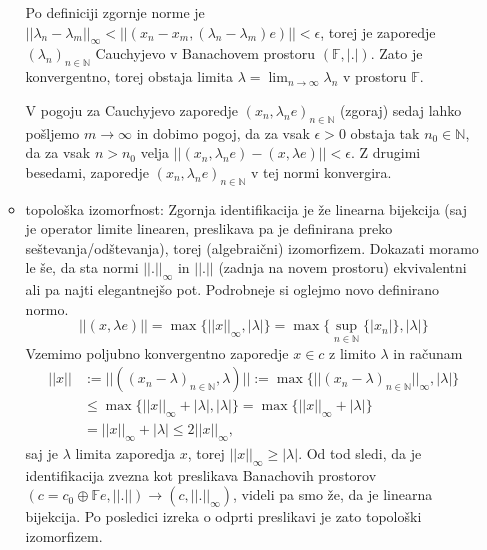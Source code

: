 \documentclass[a4paper, 12pt]{article}
\newcommand{\N}{\mathbb{N}}
\newcommand{\F}{\mathbb{F}}
\begin{document}
\begin{enumerate}[label=(\alph*)]
\begin{itemize}
		Po definiciji zgornje norme je $||\lambda_n - \lambda_m||_\infty < ||(x_n - x_m, (\lambda_n-\lambda_m)e)|| < \epsilon$,
		torej je zaporedje $(\lambda_n)_{n\in\N}$ Cauchyjevo v Banachovem prostoru $(\F, |.|)$. Zato je konvergentno, torej obstaja limita $\lambda = \lim_{n \to \infty} \lambda_n$ v prostoru $\F$.
		
		V pogoju za Cauchyjevo zaporedje $(x_n, \lambda_n e)_{n\in\N}$ (zgoraj) sedaj lahko pošljemo $m \to \infty$ in dobimo pogoj, da za vsak $\epsilon > 0$ obstaja tak $n_0 \in \N$, da za vsak $n > n_0$ velja $||(x_n, \lambda_n e) - (x, \lambda e) || < \epsilon$. Z drugimi besedami, zaporedje $(x_n, \lambda_n e)_{n\in\N}$ v tej normi konvergira.
		\item topološka izomorfnost:
		Zgornja identifikacija je že linearna bijekcija (saj je operator limite linearen, preslikava pa je definirana preko seštevanja/odštevanja), torej (algebraični) izomorfizem. Dokazati moramo le še, da sta normi $||.||_\infty$ in $||.||$ (zadnja na novem prostoru) ekvivalentni ali pa najti elegantnejšo pot.
		Podrobneje si oglejmo novo definirano normo.
		\[
		||(x, \lambda e)|| = \max\lbrace ||x||_\infty, |\lambda| \rbrace = \max\lbrace \sup_{n\in\N}\lbrace |x_n| \rbrace, |\lambda| \rbrace
		\]
		Vzemimo poljubno konvergentno zaporedje $x \in c$ z limito $\lambda$ in računam
		\begin{align*}
		||x|| &:= ||((x_n-\lambda)_{n\in\N}, \lambda)|| := \max\lbrace ||(x_n - \lambda)_{n\in\N}||_\infty, |\lambda|\rbrace \\ 
		&\leq \max\lbrace ||x||_\infty + |\lambda|, |\lambda|\rbrace = \max\lbrace ||x||_\infty + |\lambda|\rbrace \\
		& = ||x||_\infty + |\lambda| \leq 2 ||x||_\infty,
		\end{align*}
		saj je $\lambda$ limita zaporedja $x$, torej $||x||_\infty \geq |\lambda|$.
		Od tod sledi, da je identifikacija zvezna kot preslikava Banachovih prostorov $(c = c_0 \oplus \F e, ||.||) \to (c, ||.||_\infty)$, videli pa smo že, da je linearna bijekcija. Po posledici izreka o odprti preslikavi je zato topološki izomorfizem.
	\end{itemize}
\end{enumerate}
\end{document}
